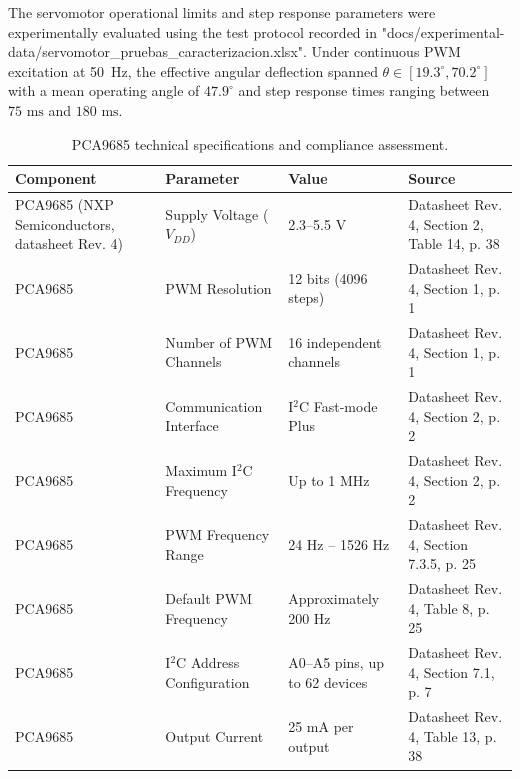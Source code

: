 \documentclass[lettersize,journal]{IEEEtran}
\begin{document}
The servomotor operational limits and step response parameters were experimentally evaluated using the test protocol recorded in "docs/experimental-data/servomotor\_pruebas\_caracterizacion.xlsx". Under continuous PWM excitation at 50~Hz, the effective angular deflection spanned $\theta \in [19.3^\circ, 70.2^\circ]$ with a mean operating angle of $47.9^\circ$ and step response times ranging between $75\text{ ms}$ and $180\text{ ms}$.

\begin{table}[ht]
	\centering
	\caption{PCA9685 technical specifications and compliance assessment.}
	\label{tab:PCA9685}
	\scriptsize
	\renewcommand{\arraystretch}{1.2}
	\begin{tabular}{|p{1.4cm}|p{1.8cm}|p{1.8cm}|p{1.8cm}|}
		\hline
		\textbf{Component} &
		\textbf{Parameter} &
		\textbf{Value} &
		\textbf{Source}\\
		\hline
		
		PCA9685 (NXP Semiconductors, datasheet Rev. 4) &
		Supply Voltage ($V_{DD}$) &
		2.3--5.5 V &
		Datasheet Rev. 4, Section 2, Table 14, p. 38 \\
		\hline
		
		PCA9685 &
		PWM Resolution &
		12 bits (4096 steps) &
		Datasheet Rev. 4, Section 1, p. 1 \\
		\hline
		
		PCA9685 &
		Number of PWM Channels &
		16 independent channels &
		Datasheet Rev. 4, Section 1, p. 1 \\
		\hline
		
		PCA9685 &
		Communication Interface &
		I$^2$C Fast-mode Plus &
		Datasheet Rev. 4, Section 2, p. 2 \\
		\hline
		
		PCA9685 &
		Maximum I$^2$C Frequency &
		Up to 1 MHz &
		Datasheet Rev. 4, Section 2, p. 2 \\
		\hline
		
		PCA9685 &
		PWM Frequency Range &
		24 Hz -- 1526 Hz &
		Datasheet Rev. 4, Section 7.3.5, p. 25 \\
		\hline
		
		PCA9685 &
		Default PWM Frequency &
		Approximately 200 Hz &
		Datasheet Rev. 4, Table 8, p. 25 \\
		\hline
		
		PCA9685 &
		I$^2$C Address Configuration &
		A0--A5 pins, up to 62 devices &
		Datasheet Rev. 4, Section 7.1, p. 7 \\
		\hline
		
		PCA9685 &
		Output Current &
		25 mA per output &
		Datasheet Rev. 4, Table 13, p. 38 \\
		\hline
		

\end{tabular}
\end{table}
\end{document}
